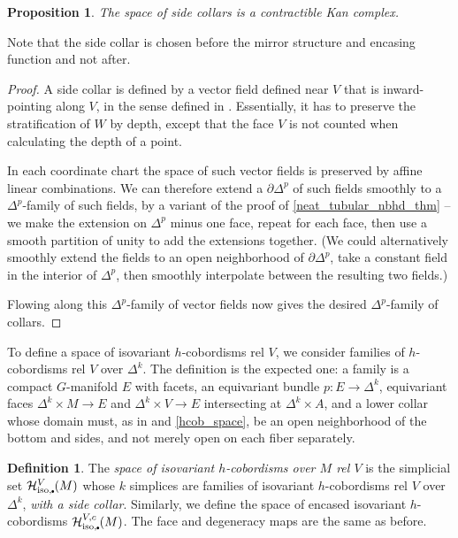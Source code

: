 \documentclass[11pt]{amsart}
\newtheorem{prop}{Proposition}[section]
\theoremstyle{definition}
\newtheorem{defn}{Definition}[section]
\numberwithin{equation}{section}
\numberwithin{figure}{section}
\newcommand{\mc}{\mathcal}
\newcommand{\iso}{\mathrm{iso}}
\newcommand{\sbt}{\,\begin{picture}(-1,1)(0.5,-1)\circle*{1.8}\end{picture}\hspace{.05cm}}
\newcommand{\ourdefn}[1]{{\it #1}}
\newcommand{\rh}{encasing function }
\begin{document}
\begin{prop}\label{collars_contractible}
	The space of side collars is a contractible Kan complex.
\end{prop}

Note that the side collar is chosen before the mirror structure and \rh and not after.
\begin{proof}
	A side collar is defined by a vector field defined near $V$ that is inward-pointing along $V$, in the sense defined in \cite[Lem 2.31]{GIMM1}. Essentially, it has to preserve the stratification of $W$ by depth, except that the face $V$ is not counted when calculating the depth of a point.
	
	In each coordinate chart the space of such vector fields is preserved by affine linear combinations. We can therefore extend a  $\partial \Delta^p$ of such fields smoothly to a $\Delta^p$-family of such fields, by a variant of the proof of \autoref{neat_tubular_nbhd_thm} -- we make the extension on $\Delta^p$ minus one face, repeat for each face, then use a smooth partition of unity to add the extensions together. (We could alternatively smoothly extend the fields to an open neighborhood of $\partial\Delta^p$, take a constant field in the interior of $\Delta^p$, then smoothly interpolate between the resulting two fields.)
	
	Flowing along this $\Delta^p$-family of vector fields now gives the desired $\Delta^p$-family of collars.
\end{proof}

To define a space of isovariant $h$-cobordisms rel $V$, we consider families of $h$-cobordisms rel $V$ over $\Delta^k$. The definition is the expected one: a family is a compact $G$-manifold $E$ with facets, an equivariant bundle $p\colon E \to \Delta^k$, equivariant faces $\Delta^k \times M \to E$ and $\Delta^k \times V \to E$ intersecting at $\Delta^k \times A$, and a lower collar %
 whose domain must, as in \cite[Def 4.8]{GIMM1} and \autoref{hcob_space}, be an open neighborhood of the bottom and sides, and not merely open on each fiber separately.

\begin{defn}
 The \ourdefn{space of isovariant $h$-cobordisms over $M$ rel $V$}  is the simplicial set $\mc H_{\iso,\sbt}^{V}(M)$ whose $k$ simplices are families of isovariant $h$-cobordisms rel $V$ over $\Delta^k$, \emph{with a side collar}. Similarly, we define the space of encased isovariant $h$-cobordisms $\mc H_{\iso,\sbt}^{V,c}(M)$. The face and degeneracy maps are the same as before.
\end{defn}
\end{document}
